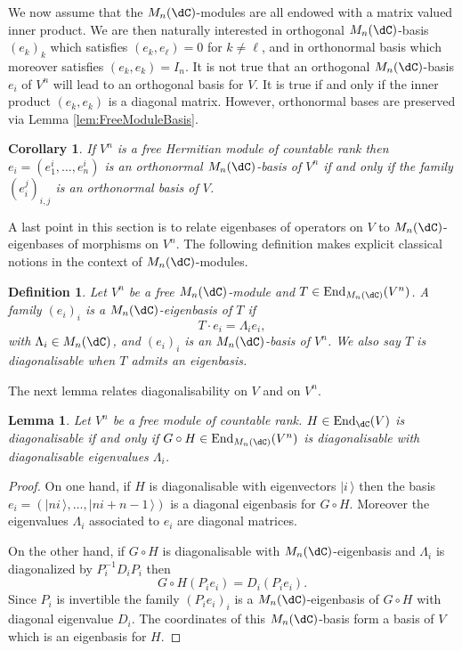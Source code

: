 \documentclass[a4paper,reqno]{amsart}
\DeclareMathOperator\End{ End}
\newtheorem{corollary}[theorem]{Corollary}
\newtheorem{lemma}[theorem]{Lemma}
\newtheorem{definition}[theorem]{Definition}
\theoremstyle{definition}
\numberwithin{equation}{section}
\newcommand{\ket}[1]{\mid{#1}\,\rangle}
\begin{document}
We now assume that the $M_n(\dC)$-modules are all endowed with a matrix valued inner product. We are then naturally interested in orthogonal $M_n(\dC)$-basis $(e_k)_k$ which satisfies $(e_k,e_\ell)=0$ for $k\neq \ell$, and in orthonormal basis which moreover satisfies $(e_k,e_k)=I_n$. It is not true that an orthogonal $M_n(\dC)$-basis $e_i$ of $V^n$ will lead to an orthogonal basis for $V$. It is true if and only if the inner product $(e_k,e_k)$ is a diagonal matrix. However, orthonormal bases are preserved via Lemma \ref{lem:FreeModuleBasis}. 

\begin{corollary}
    If $V^n$ is a free Hermitian module of countable rank then  $e_i=(e_1^i,\ldots, e_n^i)$ is an orthonormal $M_n(\dC)$-basis of $V^n$ if and only if the family $(e_i^j)_{i,j}$ is an orthonormal basis of $V$.
\end{corollary}

A last point in this section is to relate eigenbases of operators on $V$ to $M_n(\dC)$-eigenbases of morphisms on $V^n$. The following definition makes explicit classical notions in the context of $M_n(\dC)$-modules. 

\begin{definition}
    Let $V^n$ be a free $M_n(\dC)$-module and $T\in \End_{M_n(\dC)}(V^n)$. A family $(e_i)_i$ is a $M_n(\dC)$-eigenbasis of $T$ if 
    \begin{equation}
    T\cdot e_i=\Lambda_i e_i,
    \end{equation}
    with $\Lambda_i\in M_n(\dC)$, and $(e_i)_i$ is an $M_n(\dC)$-basis of $V^n$. We also say $T$ is diagonalisable when $T$ admits an eigenbasis. 
\end{definition}


The next lemma relates diagonalisability on $V$ and on $V^n$. 
\begin{lemma}\label{lem:Diagonalisability}
    Let $V^n$ be a free module of countable rank. $H\in \End_\dC(V)$ is diagonalisable if and only if $G\circ H \in \End_{M_n(\dC)}(V^n)$ is diagonalisable with diagonalisable eigenvalues $\Lambda_i$.
\end{lemma}
\begin{proof}
On one hand, if $H$ is diagonalisable with eigenvectors $\ket{i}$ then the basis $e_i=(\ket{ni},\ldots,\ket{ni+n-1})$ is a diagonal eigenbasis for $G\circ H$. Moreover the eigenvalues $\Lambda_i$ associated to $e_i$ are diagonal matrices. 

On the other hand, if $G\circ H$ is diagonalisable with $M_n(\dC)$-eigenbasis and $\Lambda_i$ is diagonalized by $P_i^{-1} D_i P_i$ then
    \begin{equation}
    G\circ H (P_i e_i)= D_i \left(P_ie_i\right). 
    \end{equation}
    Since $P_i$ is invertible the family $(P_i e_i)_i $ is a $M_n(\dC)$-eigenbasis of $G\circ H$ with diagonal eigenvalue $D_i$. The coordinates of this $M_n(\dC)$-basis form a basis of $V$ which is an eigenbasis for $H$. 
\end{proof}
\end{document}
